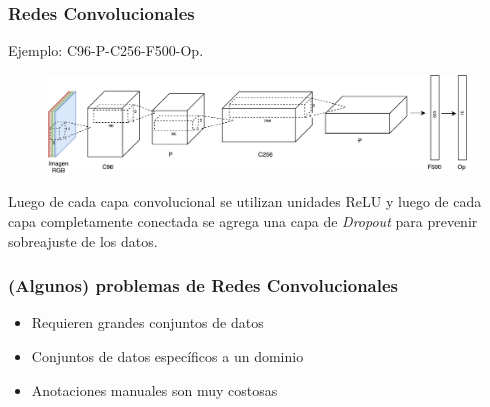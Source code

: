 \documentclass{beamer}
\begin{document}
\begin{frame}[plain]
\frametitle{Redes Convolucionales}
Ejemplo: C96-P-C256-F500-Op.
\vfill
\begin{figure}
    \centering
    \includegraphics[width=\textwidth]{images/net_example.pdf}
\end{figure}
\vfill
Luego de cada capa convolucional se utilizan unidades ReLU y luego de cada capa completamente conectada se agrega una capa de \textit{Dropout} para prevenir sobreajuste de los datos.
\vfill
\end{frame}




\begin{frame}[plain]
\frametitle{(Algunos) problemas de Redes Convolucionales}
\begin{itemize}
    \item Requieren grandes conjuntos de datos
    \item Conjuntos de datos específicos a un dominio
    \item Anotaciones manuales son muy costosas
\end{itemize}
\end{frame}
\end{document}

